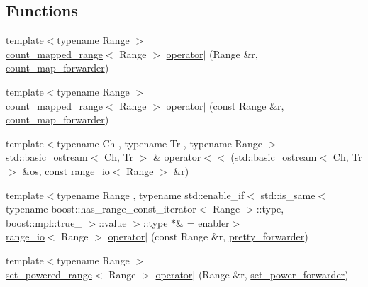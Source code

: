 \subsection*{\-Functions}
\begin{DoxyCompactItemize}
\item 
{\footnotesize template$<$typename Range $>$ }\\\hyperlink{classyuh_1_1range__detail_1_1count__mapped__range}{count\-\_\-mapped\-\_\-range}$<$ \-Range $>$ \hyperlink{namespaceyuh_1_1range__detail_a128712717771a96265117e448135e6b8}{operator$|$} (\-Range \&r, \hyperlink{structyuh_1_1range__detail_1_1count__map__forwarder}{count\-\_\-map\-\_\-forwarder})
\item 
{\footnotesize template$<$typename Range $>$ }\\\hyperlink{classyuh_1_1range__detail_1_1count__mapped__range}{count\-\_\-mapped\-\_\-range}$<$ \-Range $>$ \hyperlink{namespaceyuh_1_1range__detail_abf270b3295a983c29653957120b0d172}{operator$|$} (const \-Range \&r, \hyperlink{structyuh_1_1range__detail_1_1count__map__forwarder}{count\-\_\-map\-\_\-forwarder})
\item 
{\footnotesize template$<$typename Ch , typename Tr , typename Range $>$ }\\std\-::basic\-\_\-ostream$<$ \-Ch, \-Tr $>$ \& \hyperlink{namespaceyuh_1_1range__detail_a6a69e861128439de1b09739e9d88d6c6}{operator$<$$<$} (std\-::basic\-\_\-ostream$<$ \-Ch, \-Tr $>$ \&os, const \hyperlink{structyuh_1_1range__detail_1_1range__io}{range\-\_\-io}$<$ \-Range $>$ \&r)
\item 
{\footnotesize template$<$typename Range , typename std\-::enable\-\_\-if$<$ std\-::is\-\_\-same$<$ typename boost\-::has\-\_\-range\-\_\-const\-\_\-iterator$<$ Range $>$\-::type, boost\-::mpl\-::true\-\_\- $>$\-::value $>$\-::type $\ast$\&  = enabler$>$ }\\\hyperlink{structyuh_1_1range__detail_1_1range__io}{range\-\_\-io}$<$ \-Range $>$ \hyperlink{namespaceyuh_1_1range__detail_a7ee9acf371d7ed5f8107b04dde451cd8}{operator$|$} (const \-Range \&r, \hyperlink{structyuh_1_1range__detail_1_1pretty__forwarder}{pretty\-\_\-forwarder})
\item 
{\footnotesize template$<$typename Range $>$ }\\\hyperlink{classyuh_1_1range__detail_1_1set__powered__range}{set\-\_\-powered\-\_\-range}$<$ \-Range $>$ \hyperlink{namespaceyuh_1_1range__detail_ade0b1e4024c0bba4ebcc9ba0a977512a}{operator$|$} (\-Range \&r, \hyperlink{structyuh_1_1range__detail_1_1set__power__forwarder}{set\-\_\-power\-\_\-forwarder})

\end{DoxyCompactItemize}
